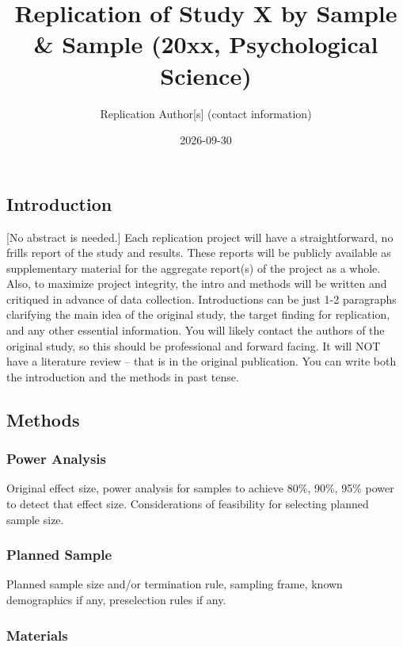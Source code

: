\documentclass[
  letterpaper,
  DIV=11,
  numbers=noendperiod]{scrartcl}
\title{Replication of Study X by Sample \& Sample (20xx, Psychological
Science)}
\author{Replication Author{[}s{]} (contact information)}
\date{2026-09-30}
\renewcommand*\contentsname{Table of contents}
\newcommand\contentsname{Table of contents}
\begin{document}
\maketitle

\renewcommand*\contentsname{Table of contents}
{
\setcounter{tocdepth}{3}
\tableofcontents
}

\subsection{Introduction}\label{introduction}

{[}No abstract is needed.{]} Each replication project will have a
straightforward, no frills report of the study and results. These
reports will be publicly available as supplementary material for the
aggregate report(s) of the project as a whole. Also, to maximize project
integrity, the intro and methods will be written and critiqued in
advance of data collection. Introductions can be just 1-2 paragraphs
clarifying the main idea of the original study, the target finding for
replication, and any other essential information. You will likely
contact the authors of the original study, so this should be
professional and forward facing. It will NOT have a literature review --
that is in the original publication. You can write both the introduction
and the methods in past tense.

\subsection{Methods}\label{methods}

\subsubsection{Power Analysis}\label{power-analysis}

Original effect size, power analysis for samples to achieve 80\%, 90\%,
95\% power to detect that effect size. Considerations of feasibility for
selecting planned sample size.

\subsubsection{Planned Sample}\label{planned-sample}

Planned sample size and/or termination rule, sampling frame, known
demographics if any, preselection rules if any.

\subsubsection{Materials}\label{materials}
\end{document}
